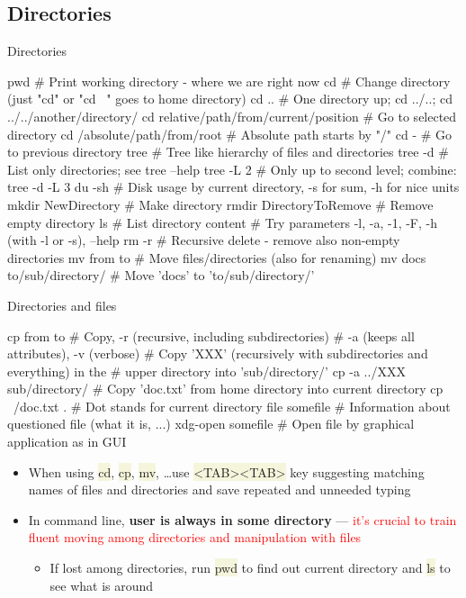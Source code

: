 \documentclass[compress, ucs, xelatex, 11pt, xcolor=svgnames, aspectratio=169,
	hyperref={
		bookmarks=true,
		unicode=true,
		colorlinks=true,
		pdftitle={Linux, command line and MetaCentrum},
		plainpages=false,
		pdfauthor={Vojtech Zeisek},
		pdfsubject={Course about use of Linux command line, writing shell scripts and using MetaCentrum of CESNET},
		pdfcreator={XeLaTeX},
		pdfkeywords={Linux, GNU, BASH, shell, command line, MetaCentrum},
		linkcolor=DarkRed, %
		anchorcolor=DarkBlue, %
		citecolor=Indigo, %
		filecolor=NavyBlue, %
		menucolor=DarkMagenta, %
		urlcolor=DarkBlue, %
		pdftex},
	url={hyphens, lowtilde} %
	]{beamer}
\renewcommand{\texttt}[1]{\colorbox{Beige}{{\ttfamily #1}}}
\renewcommand{\alert}[1]{\textcolor{red}{#1}}
\begin{document}
\subsection{Directories}

\begin{frame}[fragile]{Directories}
	\begin{bashcode}
    pwd # Print working directory - where we are right now
    cd # Change directory (just "cd" or "cd ~" goes to home directory)
    cd .. # One directory up; cd ../..; cd ../../another/directory/
    cd relative/path/from/current/position # Go to selected directory
    cd /absolute/path/from/root # Absolute path starts by "/"
    cd - # Go to previous directory
    tree # Tree like hierarchy of files and directories
    tree -d # List only directories; see tree --help
    tree -L 2 # Only up to second level; combine: tree -d -L 3
    du -sh # Disk usage by current directory, -s for sum, -h for nice units
    mkdir NewDirectory # Make directory
    rmdir DirectoryToRemove # Remove empty directory
    ls # List directory content
       # Try parameters -l, -a, -1, -F, -h (with -l or -s), --help
    rm -r # Recursive delete - remove also non-empty directories
    mv from to # Move files/directories (also for renaming)
    mv docs to/sub/directory/ # Move 'docs' to 'to/sub/directory/'
	\end{bashcode}
\end{frame}

\begin{frame}[fragile]{Directories and files}
	\begin{bashcode}
    cp from to # Copy, -r (recursive, including subdirectories)
               # -a (keeps all attributes), -v (verbose)
    # Copy 'XXX' (recursively with subdirectories and everything) in the
    # upper directory into 'sub/directory/'
    cp -a ../XXX sub/directory/
    # Copy 'doc.txt' from home directory into current directory
    cp ~/doc.txt . # Dot stands for current directory
    file somefile # Information about questioned file (what it is, ...)
    xdg-open somefile # Open file by graphical application as in GUI
	\end{bashcode}
\begin{itemize}
	\item When using \texttt{cd}, \texttt{cp}, \texttt{mv}, \ldots use \texttt{<TAB><TAB>} key suggesting matching names of files and directories and save repeated and unneeded typing
	\item In command line, \textbf{user is always in some directory} --- \alert{it's crucial to train fluent moving among directories and manipulation with files}
	\begin{itemize}
		\item If lost among directories, run \texttt{pwd} to find out current directory and \texttt{ls} to see what is around
	\end{itemize}
\end{itemize}
\end{frame}
\end{document}
